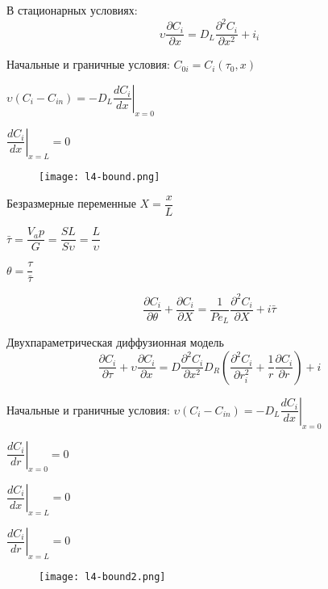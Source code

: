 \begin{frame}
	В стационарных условиях:
	\begin{equation}
		\upsilon \dfrac{ \partial C_i } { \partial x } = D_L \dfrac { \partial ^2 C_i } {\partial { x^2 }}+ i_i
	\end{equation}
	
	Начальные и граничные условия:
	$C_{0i} = C_i( \tau_0 , x )$
	
	$\upsilon ( C_i -C_{in} ) = -D_L \left. \dfrac {d C_i} {dx} \right| _ { x=0 }$
	
	$\left. \dfrac {dC_i} {dx} \right| _ { x=L } =0$
	
	
	\begin{figure}[h]
		\texttt{[image: l4-bound.png]}
	\end{figure}
\end{frame}	

\begin{frame}
	Безразмерные переменные
	$X= \dfrac {x} {L}$
	
	$\bar \tau = \dfrac {V_ap} {G} = \dfrac { S L }  { S \upsilon } = \dfrac {L} {\upsilon}$
	
	$\theta= \dfrac { \tau } { \bar{\tau} }$
	
	\begin{equation}
		\dfrac {\partial C_i} {\partial \theta } + \dfrac{ \partial C_i } { \partial X } = \dfrac {1}  { Pe_L } \dfrac { \partial^2 C_i }  { \partial X } + i \bar{\tau}
	\end{equation}
	
		
		
	Двухпараметрическая диффузионная модель
	\begin{equation}
		\dfrac{ \partial C_i } { \partial \tau } + \upsilon \dfrac{ \partial C_i } { \partial x } = D \dfrac { \partial ^2 C_i } {\partial { x^2 }} D_R \left( \dfrac{\partial ^2 C_i}{\partial r_i^2}+ \dfrac {1} {r} \dfrac {\partial C_i} {\partial r} \right)+i
	\end{equation}
	
\end{frame}

\begin{frame}
	Начальные и граничные условия:
	$\upsilon ( C_i -C_{in} ) = -D_L \left. \dfrac {d C_i} {dx} \right| _ { x=0 }$
	
	$\left. \dfrac {dC_i}{dr} \right| _ { x=0 } =0$
	
	$\left. \dfrac { dC_i} {dx} \right| _ { x=L } =0$
	
	$\left. \dfrac {dC_i} {dr} \right| _ { x=L } =0$
	
	
	\begin{figure}[h]
		\texttt{[image: l4-bound2.png]}
	\end{figure}
\end{frame}

